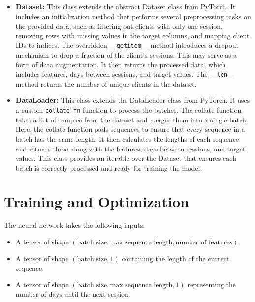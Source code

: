 \begin{itemize}
    \item \textbf{Dataset:} This class extends the abstract Dataset class from PyTorch.
          It includes an initialization method that performs several preprocessing
          tasks on the provided data, such as filtering out clients with only one
          session, removing rows with missing values in the target columns, and
          mapping client IDs to indices. The overridden \texttt{\_\_getitem\_\_} method
          introduces a dropout mechanism to drop a fraction of the client's sessions.
          This may serve as a form of data augmentation. It then returns the processed
          data, which includes features, days between sessions, and target values.
          The \texttt{\_\_len\_\_} method returns the number of unique clients in the dataset.

    \item \textbf{DataLoader:} This class extends the DataLoader class from PyTorch.
          It uses a custom \texttt{collate\_fn} function to process the batches.
          The collate function takes a list of samples from the dataset and merges
          them into a single batch. Here, the collate function pads sequences to
          ensure that every sequence in a batch has the same length. It then calculates
          the lengths of each sequence and returns these along with the features,
          days between sessions, and target values. This class provides an iterable
          over the Dataset that ensures each batch is correctly processed and ready
          for training the model.
\end{itemize}

\section{Training and Optimization}

The neural network takes the following inputs:

\begin{itemize}
    \item A tensor of shape $(\text{batch size}, \text{max sequence length}, \text{number
                  of features})$.
    \item A tensor of shape $(\text{batch size}, 1)$ containing the length of the current
          sequence.
    \item A tensor of shape $(\text{batch size}, \text{max sequence length}, 1)$
          representing the number of days until the next session.
\end{itemize}

